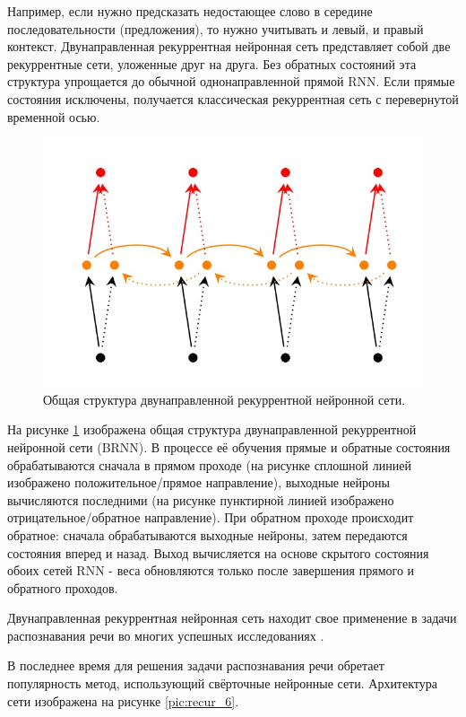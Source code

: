 Например, если нужно предсказать недостающее слово в середине последовательности (предложения), то нужно учитывать и левый, и правый контекст. 
Двунаправленная рекуррентная нейронная сеть представляет собой две рекуррентные сети, уложенные друг на друга. 
Без обратных состояний эта структура упрощается до обычной однонаправленной прямой RNN. 
Если прямые состояния исключены, получается классическая рекуррентная сеть с перевернутой временной осью.

\begin{figure}[h]
\includegraphics[width=0.75\columnwidth]{./img/recur_5.jpg}
\centering
\caption{Общая структура двунаправленной рекуррентной нейронной сети.}
\label{pic:recur_5}
\end{figure}


На рисунке \ref{pic:recur_5} изображена общая структура двунаправленной рекуррентной нейронной сети (BRNN). 
В процессе её обучения прямые и обратные состояния обрабатываются сначала в прямом проходе 
(на рисунке сплошной линией изображено положительное/прямое направление), выходные нейроны вычисляются последними 
(на рисунке пунктирной линией изображено отрицательное/обратное направление). 
При обратном проходе происходит обратное: сначала обрабатываются выходные нейроны, затем передаются состояния вперед и назад. 
Выход вычисляется на основе скрытого состояния обоих сетей RNN - веса обновляются только после завершения прямого и обратного проходов.

Двунаправленная рекуррентная нейронная сеть находит свое применение в задачи распознавания речи во многих успешных исследованиях \cite{3_recur}.

В последнее время для решения задачи распознавания речи обретает популярность \cite{4_recur}\cite{5_recur}\cite{6_recur} метод, 
использующий свёрточные нейронные сети. Архитектура сети изображена на рисунке \ref{pic:recur_6}.

